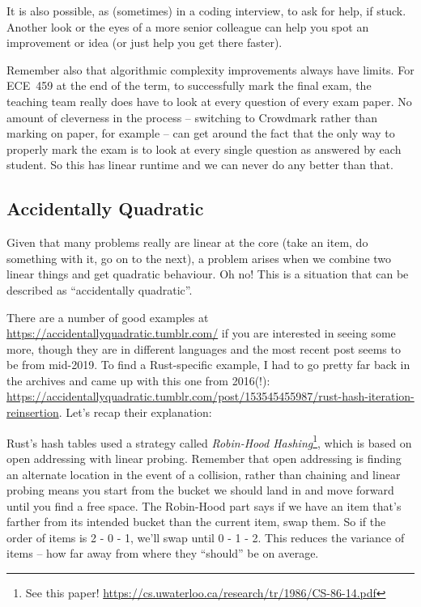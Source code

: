 It is also possible, as (sometimes) in a coding interview, to ask for help, if stuck. Another look or the eyes of a more senior colleague can help you spot an improvement or idea (or just help you get there faster). 

Remember also that algorithmic complexity improvements always have limits. For ECE~459 at the end of the term, to successfully mark the final exam, the teaching team really does have to look at every question of every exam paper. No amount of cleverness in the process -- switching to Crowdmark rather than marking on paper, for example -- can get around the fact that the only way to properly mark the exam is to look at every single question as answered by each student. So this has linear runtime and we can never do any better than that. 

\subsection*{Accidentally Quadratic}
Given that many problems really are linear at the core (take an item, do something with it, go on to the next), a problem arises when we combine two linear things and get quadratic behaviour. Oh no! This is a situation that can be described as ``accidentally quadratic''.

There are a number of good examples at \url{https://accidentallyquadratic.tumblr.com/} if you are interested in seeing some more, though they are in different languages and the most recent post seems to be from mid-2019. To find a Rust-specific example, I had to go pretty far back in the archives and came up with this one from 2016(!): \url{https://accidentallyquadratic.tumblr.com/post/153545455987/rust-hash-iteration-reinsertion}. Let's recap their explanation:

Rust's hash tables used a strategy called \textit{Robin-Hood Hashing}\footnote{See this paper! \url{https://cs.uwaterloo.ca/research/tr/1986/CS-86-14.pdf}}, which is based on open addressing with linear probing. Remember that open addressing is finding an alternate location in the event of a collision, rather than chaining and linear probing means you start from the bucket we should land in and move forward until you find a free space. The Robin-Hood part says if we have an item that's farther from its intended bucket than the current item, swap them. So if the order of items is 2 - 0 - 1, we'll swap until 0 - 1 - 2. This reduces the variance of items -- how far away from where they ``should'' be on average.

